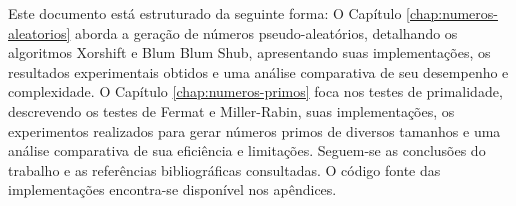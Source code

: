 Este documento está estruturado da seguinte forma: O Capítulo \ref{chap:numeros-aleatorios} aborda a geração de números pseudo-aleatórios, detalhando os algoritmos Xorshift e Blum Blum Shub, apresentando suas implementações, os resultados experimentais obtidos e uma análise comparativa de seu desempenho e complexidade. O Capítulo \ref{chap:numeros-primos} foca nos testes de primalidade, descrevendo os testes de Fermat e Miller-Rabin, suas implementações, os experimentos realizados para gerar números primos de diversos tamanhos e uma análise comparativa de sua eficiência e limitações. Seguem-se as conclusões do trabalho e as referências bibliográficas consultadas. O código fonte das implementações encontra-se disponível nos apêndices.